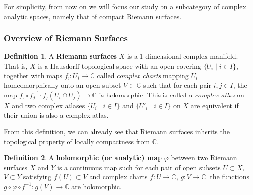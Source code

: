 \documentclass{article}
\theoremstyle{plain}
\newtheorem{theorem}{Theorem}[subsection]
\theoremstyle{definition}
\newtheorem{definition}[theorem]{Definition}
\begin{document}

\noindent For simplicity, from now on we will focus our study on a subcategory of complex analytic spaces, namely that of compact Riemann surfaces. 
\subsubsection{Overview of Riemann Surfaces}

\begin{definition}
    A \textbf{Riemann surfaces} $X$ is a $1$-dimensional complex manifold. 
    That is, $X$ is a Hausdorff topological space with an open covering $\{U_i\mid i\in I\}$, together with maps $f_i:U_i\rightarrow \mathbb{C}$ called \textit{complex charts} mapping $U_i$ homeomorphically onto an open subset $V\subset \mathbb{C}$ such that for each pair $i,j\in I$, the map $f_i\circ f_j^{-1} : f_j(U_i\cap U_j) \rightarrow \mathbb{C}$ is holomorphic. This is called a \textit{complex atlas} on $X$ and two complex atlases $\{U_i\mid i\in I\}$ and $\{ U'_i\mid i\in I\}$ on $X$ are equivalent if their union is also a complex atlas.
\end{definition}

\noindent From this definition, we can already see that Riemann surfaces inherits the topological property of locally compactness from $\mathbb{C}$.

\begin{definition}
    A \textbf{holomorphic (or analytic) map} $\varphi$ between two Riemann surfaces $X$ and $Y$ is a continuous map such for each pair of open subsets $U\subset X$, $V\subset Y$ satisfying $f(U)\subset V$ and complex charts $f:U\rightarrow \mathbb{C}$, $g:V\rightarrow \mathbb{C}$, the functions $g\circ\varphi\circ f^{-1}: g(V)\rightarrow \mathbb{C}$ are holomorphic.
\end{definition}
\end{document}
